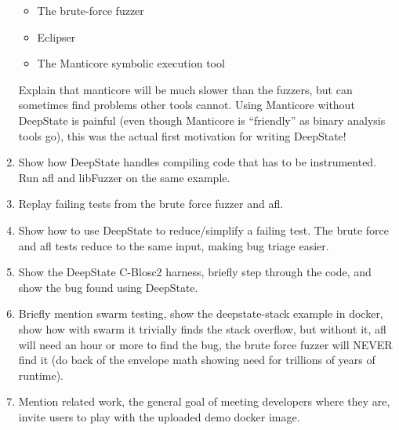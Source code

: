 \documentclass[sigconf]{acmart}
\begin{document}
\begin{enumerate}
  \begin{itemize}
  \item The brute-force fuzzer
  \item Eclipser
  \item The Manticore symbolic execution tool
  \end{itemize}

  Explain that manticore will be much slower than the fuzzers, but can sometimes find problems other tools cannot.  Using Manticore without DeepState is painful (even though Manticore is ``friendly'' as binary analysis tools go), this was the actual first motivation for writing DeepState!

\item Show how DeepState handles compiling code that has to be instrumented.  Run afl and libFuzzer on the same example.
  
\item Replay failing tests from the brute force fuzzer and afl.

\item Show how to use DeepState to reduce/simplify a failing test.  The brute force and afl tests reduce to the same input, making bug triage easier.

\item Show the DeepState C-Blosc2 harness, briefly step through the code, and show the bug found using DeepState.

\item Briefly mention swarm testing, show the deepstate-stack example in docker, show how with swarm it trivially finds the stack overflow, but without it, afl will need an hour or more to find the bug, the brute force fuzzer will NEVER find it (do back of the envelope math showing need for trillions of years of runtime).
  
\item Mention related work, the general goal of meeting developers where they are, invite users to play with the uploaded demo docker image.

\end{enumerate}
\end{document}
